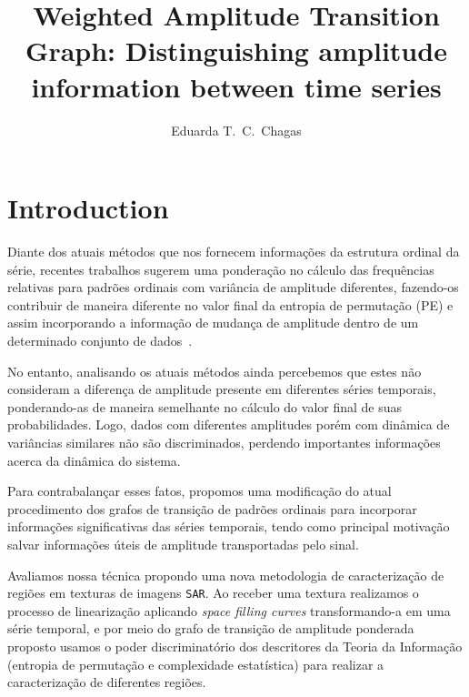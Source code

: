 \documentclass[12pt]{article}
\title{Weighted Amplitude Transition Graph: Distinguishing amplitude information between time series}
\author{Eduarda T.\ C.\ Chagas\inst{1}}
\begin{document}
\maketitle

\section{Introduction}\label{Intro}

Diante dos atuais métodos que nos fornecem informações da estrutura ordinal da série, recentes trabalhos sugerem uma ponderação no cálculo das frequências relativas para padrões ordinais com variância de amplitude diferentes, fazendo-os contribuir de maneira diferente no valor final da entropia de permutação (PE) e assim incorporando a informação de mudança de amplitude dentro de um determinado conjunto de dados~\citep{Fadlallah2013Weightedpermutation}.

No entanto, analisando os atuais métodos ainda percebemos que estes não consideram a diferença de amplitude presente em diferentes séries temporais, ponderando-as de maneira semelhante no cálculo do valor final de suas probabilidades.
Logo, dados com diferentes amplitudes porém com dinâmica de variâncias similares não são discriminados, perdendo importantes informações acerca da dinâmica do sistema.

Para contrabalançar esses fatos, propomos uma modificação do atual procedimento dos grafos de transição de padrões ordinais para incorporar informações significativas das séries temporais, tendo como principal motivação salvar informações úteis de amplitude transportadas pelo sinal.

Avaliamos nossa técnica propondo uma nova metodologia de caracterização de regiões em texturas de imagens \texttt{SAR}. 
Ao receber uma textura realizamos o processo de linearização aplicando \textit{space filling curves} transformando-a em uma série temporal, e por meio do grafo de transição de amplitude ponderada proposto usamos o poder discriminatório dos descritores da Teoria da Informação (entropia de permutação e complexidade estatística) para realizar a caracterização de diferentes regiões.
\end{document}
